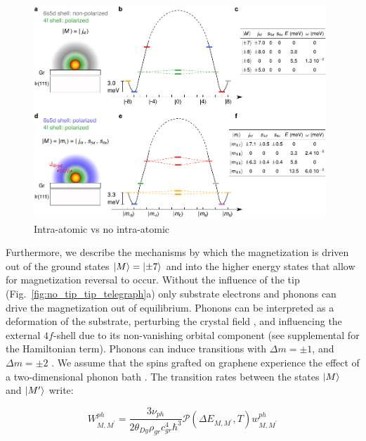 \documentclass[
reprint,amsmath,amssymb,aps]{revtex4-2}
\begin{document}
\begin{figure}[ht!]
\includegraphics[width=0.98\textwidth]{Fig1_new.pdf}
\caption{Intra-atomic vs no intra-atomic
\label{fig:intra} }
\end{figure}
Furthermore, we describe the mechanisms by which the magnetization is driven out of the ground states $\ket{M}=\ket{\pm7}$ and into the higher energy states that allow for magnetization reversal to occur. Without the influence of the tip (Fig.~\ref{fig:no_tip_tip_telegraph}a) only substrate electrons and phonons can drive the magnetization out of equilibrium. Phonons can be interpreted as a deformation of the substrate, perturbing the crystal field \citep{cervetti2016}, and influencing the external $4f$-shell due to its non-vanishing orbital component (see supplemental for the Hamiltonian term). Phonons can induce transitions with $\Delta m = \pm 1$, and $\Delta m = \pm 2$ \citep{cervetti2016}. We assume that the spins grafted on graphene experience the effect of a two-dimensional phonon bath \citep{cervetti2016}. The transition rates between the states $\ket{M}$ and $\ket{M^{\prime}}$ write:

\begin{equation}
    \label{eq:phonon_rates}
    W_{M,M^{\prime}}^{ph}=\dfrac{3 \nu_{ph}}{2\theta_{Dy}\rho_{gr}c_{gr}^4 \hbar^3} \mathcal{P} \left( \Delta E_{M,M^{\prime}}, T \right) w^{ph}_{M,M^{\prime}}
\end{equation}
\end{document}
